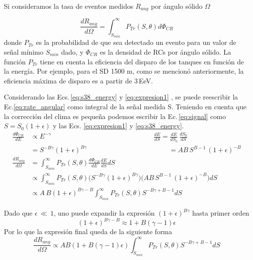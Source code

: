 Si consideramos la tasa de eventos medidos $R_{ang}$  por ángulo sólido $\Omega$

\begin{equation}
	\frac{dR_{ang}}{d\Omega} = \int_{S_{min}}^{\infty} P_{Tr}(S,\theta) d\Phi_{CR}
	\label{eq:rate_angular}
\end{equation}
donde $P_{Tr}$ es la probabilidad de que sea detectado un evento para un valor de señal mínimo $S_{min}$ dado, y $\Phi_{CR}$ es la densidad de RCs por ángulo sólido. La función $P_{Tr}$ tiene en cuenta la eficiencia del disparo de los tanques en función de la energía. Por ejemplo, para el SD 1500 m, como se mencionó anteriormente, la eficiencia máxima de disparo es a partir  de $3\,$EeV. 

Considerando  las Ecs.\,\ref{eq:s38_energy} y \ref{eq:expresion1} , se puede reescribir la Ec.\ref{eq:rate_angular} como integral de la señal medida S. Teniendo en cuenta que la corrección del clima es pequeña podemos escribir la Ec.\,\ref{eq:signal} como $S=S_0(1+\epsilon)$ y las Ecs. \ref{eq:expresion1} y \ref{eq:s38_energy}.
\begin{align*}
\frac{d\Phi_{CR}}{dE} 	&\propto E^{-\gamma} 					\qquad\qquad\qquad\qquad\qquad \quad \qquad \qquad		\frac{dE}{dS}  			= \frac{dE}{dS_0}\,\frac{dS_0}{dS}\\ 
					  	&= S^{-B\gamma}(1+\epsilon)^{B\gamma}    \qquad\qquad \qquad\qquad\qquad \qquad 				  	 = AB\,S^{B-1}\, (1+\epsilon)^{-B}\\
   		    			\frac{dR_{ang}}{d\Omega} &= \int_{S_{min}}^{\infty} P_{Tr}(S,\theta) \frac{d\Phi_{CR}}{dE} \frac{dE}{dS} dS\\
    						 &\propto \int_{S_{min}}^{\infty} P_{Tr}(S,\theta) \bigg( S^{-B\gamma}(1+\epsilon)^{B\gamma}\bigg) \bigg( AB\,S^{B-1}\, (1+\epsilon)^{-B}\bigg)dS\\
    						 &\propto A\,B (1+\epsilon)^{B\gamma - B}\int_{S_{min}}^{\infty} P_{Tr}(S,\theta) S^{-B\gamma +B -1} dS
\end{align*}

Dado que $\epsilon\,\ll\,1$, uno puede expandir la expresión $(1+\epsilon)^{B\gamma}$ hasta primer orden 
\begin{equation*}
	(1+\epsilon)^{B\gamma-B} \approx 1 + B(\gamma-1)\epsilon
\end{equation*}
Por lo que la expresión final queda de la siguiente forma
\begin{equation*}
	\frac{dR_{ang}}{d\Omega} \propto AB(1+B(\gamma - 1)\epsilon)\int_{S_{min}}^{\infty} P_{Tr}(S,\theta) S^{-B\gamma +B -1} dS
\end{equation*}

